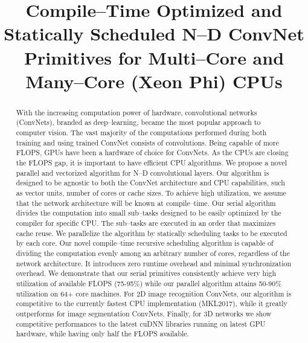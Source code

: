 \documentclass[conference]{./IEEEtran/IEEEtran}
\begin{document}
\setlength{\pdfpageheight}{\paperheight}
\setlength{\pdfpagewidth}{\paperwidth}

\title{Compile--Time Optimized and Statically Scheduled N--D ConvNet
  Primitives for Multi--Core and Many--Core (Xeon Phi) CPUs }


\author{ } \maketitle



\begin{abstract}

  With the increasing computation power of hardware, convolutional
  networks (ConvNets), branded as deep--learning, became the most
  popular approach to computer vision.  The vast majority of the
  computations performed during both training and using trained
  ConvNet consists of convolutions.  Being capable of more FLOPS, GPUs
  have been a hardware of choice for ConvNets.  As the CPUs are
  closing the FLOPS gap, it is important to have efficient CPU
  algorithms.  We propose a novel parallel and vectorized algorithm
  for N--D convolutional layers.  Our algorithm is designed to be
  agnostic to both the ConvNet architecture and CPU capabilities, such
  as vector units, number of cores or cache sizes.  To achieve high
  utilization, we assume that the network architecture will be known
  at compile--time.  Our serial algorithm divides the computation into
  small sub--tasks designed to be easily optimized by the compiler for
  specific CPU.  The sub--tasks are executed in an order that
  maximizes cache reuse.  We parallelize the algorithm by statically
  scheduling tasks to be executed by each core.  Our novel
  compile--time recursive scheduling algorithm is capable of dividing
  the computation evenly among an arbitrary number of cores,
  regardless of the network architecture.  It introduces zero runtime
  overhead and minimal synchronization overhead.  We demonstrate that
  our serial primitives consistently achieve very high utilization of
  available FLOPS (75-95\%) while our parallel algorithm attains
  50-90\% utilization on 64+ core machines.  For 2D image recognition
  ConvNets, our algorithm is competitive to the currently fastest CPU
  implementation (MKL2017), while it greatly outperforms for image
  segmentation ConvNets.  Finally, for 3D networks we show competitive
  performances to the latest cuDNN libraries running on latest GPU
  hardware, while having only half the FLOPS available.

\end{abstract}
\setlength{\belowcaptionskip}{-15pt}






%
%


%

\clearpage


\end{document}
